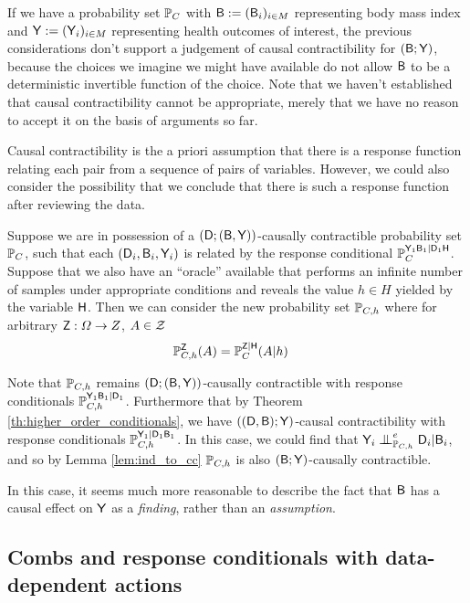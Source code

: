 If we have a probability set $\mathbb{P}_C$ with $\mathsf{B}:=(\mathsf{B}_i)_{i\in M}$ representing body mass index and $\mathsf{Y}:=(\mathsf{Y}_i)_{i\in M}$ representing health outcomes of interest, the previous considerations don't support a judgement of causal contractibility for $(\mathsf{B};\mathsf{Y})$, because the choices we imagine we might have available do not allow $\mathsf{B}$ to be a deterministic invertible function of the choice. Note that we haven't established that causal contractibility cannot be appropriate, merely that we have no reason to accept it on the basis of arguments so far.

Causal contractibility is the a priori assumption that there is a response function relating each pair from a sequence of pairs of variables. However, we could also consider the possibility that we conclude that there is such a response function after reviewing the data.

Suppose we are in possession of a $(\mathsf{D};(\mathsf{B},\mathsf{Y}))$-causally contractible probability set $\mathbb{P}_C$, such that each $(\mathsf{D}_i,\mathsf{B}_i,\mathsf{Y}_i)$ is related by the response conditional $\mathbb{P}_C^{\mathsf{Y}_1\mathsf{B}_1|\mathsf{D}_1\mathsf{H}}$. Suppose that we also have an ``oracle'' available that performs an infinite number of samples under appropriate conditions and reveals the value $h\in H$ yielded by the variable $\mathsf{H}$. Then we can consider the new probability set $\mathbb{P}_{C,h}$ where for arbitrary $\mathsf{Z}:\Omega\to Z$, $A\in \mathcal{Z}$
\begin{align}
    \mathbb{P}_{C,h}^{\mathsf{Z}}(A) &= \mathbb{P}_C^{\mathsf{Z}|\mathsf{H}}(A|h)
\end{align}

Note that $\mathbb{P}_{C,h}$ remains $(\mathsf{D};(\mathsf{B},\mathsf{Y}))$-causally contractible with response conditionals $\mathbb{P}_{C,h}^{\mathsf{Y}_1\mathsf{B}_1|\mathsf{D}_1}$. Furthermore that by Theorem \ref{th:higher_order_conditionals}, we have $((\mathsf{D},\mathsf{B});\mathsf{Y})$-causal contractibility with response conditionals $\mathbb{P}_{C,h}^{\mathsf{Y}_1|\mathsf{D}_1\mathsf{B}_1}$. In this case, we could find that $\RV{Y}_i\CI_{\prob{P}_{C,h}}^e \RV{D}_i|\RV{B}_i$, and so by Lemma \ref{lem:ind_to_cc} $\mathbb{P}_{C,h}$ is also $(\mathsf{B};\mathsf{Y})$-causally contractible.

In this case, it seems much more reasonable to describe the fact that $\mathsf{B}$ has a causal effect on $\mathsf{Y}$ as a \emph{finding}, rather than an \emph{assumption}. 


\subsection{Combs and response conditionals with data-dependent actions}\label{sec:data_dependent}



